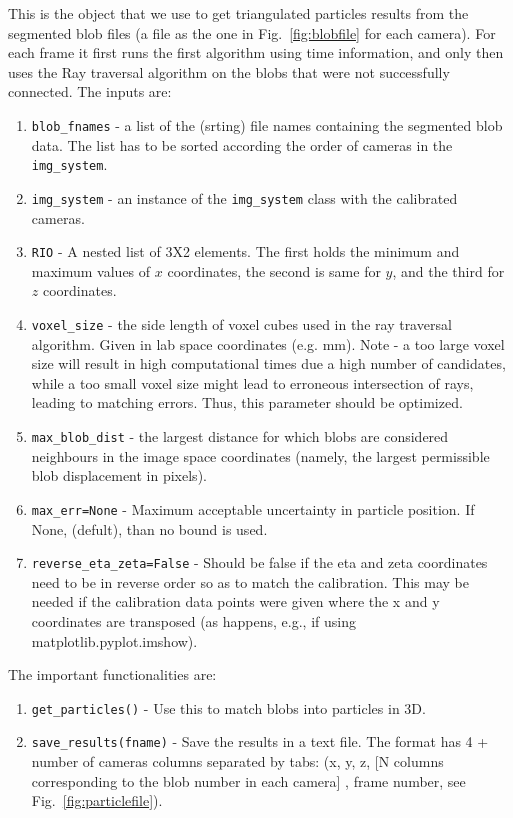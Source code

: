 \documentclass[10pt,a4paper]{article}
\begin{document}
This is the object that we use to get triangulated particles results from the segmented blob files (a file as the one in Fig.~\ref{fig:blobfile} for each camera). For each frame it first runs the first algorithm using time information, and only then uses the Ray traversal algorithm on the blobs that were not successfully connected. The inputs are:
%
\begin{enumerate}
	\item \texttt{blob\_fnames} - a list of the (srting) file names containing the segmented blob data. The list has to be sorted according the order of cameras in the \texttt{img\_system}.
	
	\item \texttt{img\_system} - an instance of the \texttt{img\_system} class with the calibrated cameras.
	
	\item \texttt{RIO} - A nested list of 3X2 elements. The first holds the minimum and  maximum values of $x$ coordinates, the second is same for $y$, and  the third for $z$ coordinates. 
	
	\item \texttt{voxel\_size} - the side length of voxel cubes used in the ray traversal algorithm. Given in lab space coordinates (e.g. mm). Note - a too large voxel size will result in high computational times due a high number of candidates, while a too small voxel size might lead to erroneous intersection of rays, leading to matching errors. Thus, this parameter should be optimized.
	
	\item \texttt{max\_blob\_dist} - the largest distance for which blobs are considered neighbours in the image space coordinates (namely, the largest permissible blob displacement in pixels).
	
	\item \texttt{max\_err=None} - Maximum acceptable uncertainty in particle position. If None, (defult), than no bound is used.
	
	\item \texttt{reverse\_eta\_zeta=False} - Should be false if the eta and zeta coordinates need to be in reverse order so as to match the calibration. This may be needed if the calibration data points were given where the x and y coordinates are transposed (as happens, e.g., if using matplotlib.pyplot.imshow).
\end{enumerate}


The important functionalities are:
%
\begin{enumerate}
	\item \texttt{get\_particles()} - Use this to match blobs into particles in 3D.
	\item \texttt{save\_results(fname)} - Save the results in a text file. The format has 4 + number of cameras columns separated by tabs:
	(x, y, z, [N columns corresponding to the blob number in each camera] , frame number, see Fig.~\ref{fig:particlefile}).
\end{enumerate}
\end{document}
